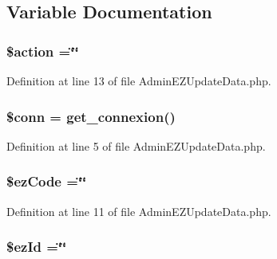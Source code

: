 \subsection{Variable Documentation}
\hypertarget{_admin_e_z_update_data_8php_aa698a3e72116e8e778be0e95d908ee30}{
\subsubsection[{\$action}]{\setlength{\rightskip}{0pt plus 5cm}\$action =\char`\"{}\char`\"{}}}\label{_admin_e_z_update_data_8php_aa698a3e72116e8e778be0e95d908ee30}


Definition at line 13 of file Admin\-E\-Z\-Update\-Data.\-php.

\hypertarget{_admin_e_z_update_data_8php_aa8a5a87b9c1a6a0819b88447cbe41877}{
\subsubsection[{\$conn}]{\setlength{\rightskip}{0pt plus 5cm}\$conn = {\bf get\-\_\-connexion}()}}\label{_admin_e_z_update_data_8php_aa8a5a87b9c1a6a0819b88447cbe41877}


Definition at line 5 of file Admin\-E\-Z\-Update\-Data.\-php.

\hypertarget{_admin_e_z_update_data_8php_a1a28f4870dd5aff7acdc3184a85a30c7}{
\subsubsection[{\$ez\-Code}]{\setlength{\rightskip}{0pt plus 5cm}\$ez\-Code =\char`\"{}\char`\"{}}}\label{_admin_e_z_update_data_8php_a1a28f4870dd5aff7acdc3184a85a30c7}


Definition at line 11 of file Admin\-E\-Z\-Update\-Data.\-php.

\hypertarget{_admin_e_z_update_data_8php_ae9a60f2c381103ddf1a3fda7be76d890}{
\subsubsection[{\$ez\-Id}]{\setlength{\rightskip}{0pt plus 5cm}\$ez\-Id =\char`\"{}\char`\"{}}}\label{_admin_e_z_update_data_8php_ae9a60f2c381103ddf1a3fda7be76d890}


